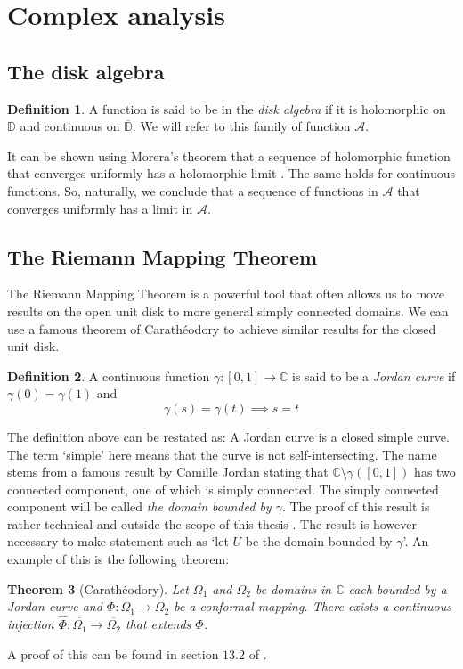 \documentclass[a4paper,12pt,twoside,BCOR=10mm]{scrbook}
\newtheorem{theorem}{Theorem}[section]
\theoremstyle{definition}
\theoremstyle{definition}
\theoremstyle{definition}
\newtheorem{definition}[theorem]{Definition}
\begin{document}
\section{Complex analysis}
\subsection{The disk algebra}
\begin{definition}
A function is said to be in the \emph{disk algebra} if it is holomorphic on $\mathbb{D}$ and continuous on $\mathbb{\overline{\mathbb{D}}}$.
We will refer to this family of function $\mathcal{A}$.
\end{definition}
It can be shown using Morera's theorem that a sequence of holomorphic function that converges uniformly has a holomorphic limit \citep{reynir}.
The same holds for continuous functions.
So, naturally, we conclude that a sequence of functions in $\mathcal{A}$ that converges uniformly has a limit in $\mathcal{A}$.
\subsection{The Riemann Mapping Theorem} 
The Riemann Mapping Theorem is a powerful tool that often allows us to move results on the open unit disk to more general simply connected domains.
We can use a famous theorem of Carathéodory to achieve similar results for the closed unit disk.
\begin{definition}
A continuous function $\gamma: [0, 1] \rightarrow \mathbb{C}$ is said to be a \emph{Jordan curve} if $\gamma(0) = \gamma(1)$ and
\[
	\gamma(s) = \gamma(t) \implies s = t \tag*{for all $s, t \in ]0, 1[$.}
\]
\end{definition}
The definition above can be restated as: A Jordan curve is a closed simple curve.
The term `simple' here means that the curve is not self-intersecting.
The name stems from a famous result by Camille Jordan stating that $\mathbb{C} \setminus \gamma([0, 1])$ has two connected component, one of which is simply connected.
The simply connected component will be called \emph{the domain bounded by $\gamma$}.
The proof of this result is rather technical and outside the scope of this thesis \citep{munkres, greenkrantz}.
The result is however necessary to make statement such as `let $U$ be the domain bounded by $\gamma$'.
An example of this is the following theorem:
\begin{theorem}[Carathéodory]
Let $\Omega_1$ and $\Omega_2$ be domains in $\mathbb{C}$ each bounded by a Jordan curve and $\Phi: \Omega_1 \rightarrow \Omega_2$ be a conformal mapping.
There exists a continuous injection $\hat{\Phi}: \overline{\Omega_1} \rightarrow \overline{\Omega_2}$ that extends $\Phi$.
\end{theorem}
A proof of this can be found in section $13.2$ of \citep{greenkrantz}.
\end{document}
